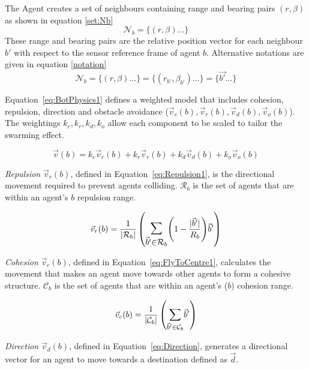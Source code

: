 \documentclass{ieeeaccess}
\newcommand{\card}[1]{\vert{#1}\vert}
\newcommand{\magn}[1]{\vert{#1}\vert}
\begin{document}
The Agent creates a set of neighbours containing range and bearing pairs
$(r,\beta)$ as shown in equation
\ref{set:Nb}
\begin{equation}
\mathcal N_b = \{ (r,\beta) \ldots \}
\label{set:Nb}
\end{equation}
These range and bearing pairs are the relative position vector for each
neighbour $b'$ with respect to the sensor reference frame of agent $b$.
Alternative notations are given in equation \ref{notation}
\begin{equation}
	\mathcal N_b = \{(r,\beta) \ldots \} = \{ (r_{b'}, \beta_{b'}) \ldots \} = \{
	\vec{b'} \ldots \}
	\label{notation}
\end{equation}

Equation~\ref{eq:BotPhysics1} defines a weighted model that includes cohesion,
repulsion, direction and obstacle avoidance ($\vec v_c(b), \vec v_r(b),
\vec v_d(b), \vec v_o(b)$). 
The weightings $k_c, k_r, k_d, k_o$ allow each component to be scaled to tailor the swarming effect. 

\begin{equation}\label{eq:BotPhysics1}
  \vec v(b) = k_c\vec v_c(b) + k_r\vec v_r(b) + k_d\vec v_d(b) + k_o\vec v_o(b)
\end{equation}

\textit{Repulsion} $\vec v_r(b)$, defined in Equation~\ref{eq:Repulsion1}, is the
directional movement required to prevent agents colliding. $\mathcal R_b$ is
the set of agents that are within an agent's $b$ repulsion range.

\begin{equation}\label{eq:Repulsion1}
\vec v_r(b) = 
\frac{1}{\card{\mathcal R_b}}
\left(
	\mathlarger{\mathlarger{\sum_{\vec b' \in \mathcal R_b}}}
	{\left( 1-\frac{\magn{\vec b'}}{R_b} \right)}
	\vec b'
\right)
\end{equation}

\textit{Cohesion} $\vec v_{c}(b)$, defined in Equation~\ref{eq:FlyToCentre1},
calculates the movement that makes an agent move towards other agents to form
a cohesive structure. $\mathcal C_b$ is the set of agents that are within an agent's ($b$) cohesion range.

\begin{equation}\label{eq:FlyToCentre1}
	\vec v_c(b) =
	\frac{1}{\card{\mathcal C_b}}\left({\mathlarger{\sum_{\vec b' \in
	\mathcal C_b}}{\vec b'}}\right)
\end{equation}

\textit{Direction} $\vec v_d(b)$, defined in Equation~\ref{eq:Direction},
generates a directional vector for an agent to move towards a destination
defined as $\vec d$.
\end{document}
